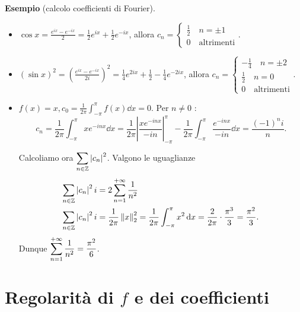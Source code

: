 %
%


\textbf{Esempio} (calcolo coefficienti di Fourier).
\begin{itemize}
\item $\cos x = \frac{e^{ix} - e^{-ix}}{2} = \frac{1}{2} e^{ix} + \frac{1}{2} e^{-ix}$, allora $ c_n =
\begin{cases}
	\frac{1}{2} \quad n = \pm 1 \\
	0 \quad \text{altrimenti} 
\end{cases}. 
$

\item $(\sin x)^2 = (\frac{e^{ix} - e^{-ix}}{2i})^2 = \frac{1}{4} e^{2ix} + \frac{1}{2} - \frac{1}{4} e^{-2ix}$, allora $c_n =
\begin{cases}
	-\frac{1}{4} \quad n = \pm 2 \\
	\frac{1}{2} \quad n = 0 \\
	0 \quad \text{altrimenti} 
\end{cases} $.

\item $f(x) = x, c_0 = \frac{1}{2\pi} \int_{-\pi}^\pi f(x) \dd x = 0$. Per $n \neq 0$ :
%
$$
c_n = \frac{1}{2\pi} \int_{-\pi}^\pi xe^{-inx} \dd x = \frac{1}{2\pi} \left| \frac{x e^{-inx}}{-in} \right|_{-\pi}^\pi - \frac{1}{2\pi} \int_{-\pi}^\pi \frac{e^{-inx}}{-in} \dd x = \frac{(-1)^n i}{n}.
$$
%

Calcoliamo ora  $\displaystyle \sum_{n \in \mathbb Z} \left| c_n \right|^2$.
Valgono le uguaglianze
%
\begin{align*}
\sum_{n \in \mathbb Z} \left| c_n \right|^2i & = 2 \sum_{n=1}^{+\infty} \frac{1}{n^2} \\
\sum_{n \in \mathbb Z} \left| c_n \right|^2i & = \frac{1}{2\pi } \left\lVert x \right\rVert_2^2 = \frac{1}{2\pi } \int_{-\pi}^\pi x^2 \,\mathrm{d} x = \frac{2}{2\pi} \cdot \frac{\pi^3}{3} = \frac{\pi^2}{3}.
\end{align*}
%
Dunque $\displaystyle \sum_{n=1}^{+\infty} \frac{1}{n^2} = \frac{\pi^2}{6}$.

\end{itemize}

\section{Regolarità di $f$ e dei coefficienti}


